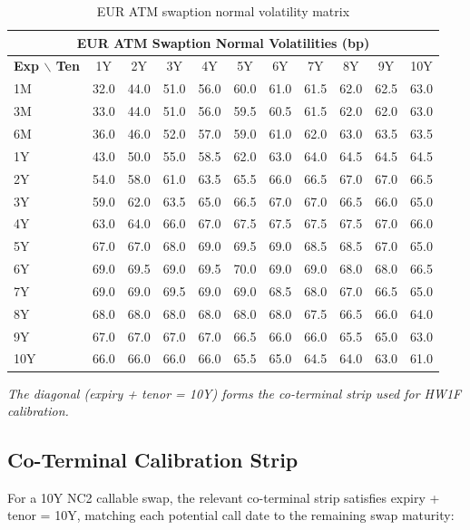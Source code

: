 \documentclass[conference]{IEEEtran}
\begin{document}
\begin{table}[!t]
\centering
\begin{tabular}{l|cccccccccc}
\toprule
\multicolumn{11}{c}{\textbf{EUR ATM Swaption Normal Volatilities (bp)}} \\
\midrule
\textbf{Exp $\backslash$ Ten} & 1Y & 2Y & 3Y & 4Y & 5Y & 6Y & 7Y & 8Y & 9Y & 10Y \\
\midrule
1M & 32.0 & 44.0 & 51.0 & 56.0 & 60.0 & 61.0 & 61.5 & 62.0 & 62.5 & 63.0 \\
3M & 33.0 & 44.0 & 51.0 & 56.0 & 59.5 & 60.5 & 61.5 & 62.0 & 62.0 & 63.0 \\
6M & 36.0 & 46.0 & 52.0 & 57.0 & 59.0 & 61.0 & 62.0 & 63.0 & 63.5 & 63.5 \\
1Y & 43.0 & 50.0 & 55.0 & 58.5 & 62.0 & 63.0 & 64.0 & 64.5 & 64.5 & 64.5 \\
2Y & 54.0 & 58.0 & 61.0 & 63.5 & 65.5 & 66.0 & 66.5 & 67.0 & 67.0 & 66.5 \\
3Y & 59.0 & 62.0 & 63.5 & 65.0 & 66.5 & 67.0 & 67.0 & 66.5 & 66.0 & 65.0 \\
4Y & 63.0 & 64.0 & 66.0 & 67.0 & 67.5 & 67.5 & 67.5 & 67.5 & 67.0 & 66.0 \\
5Y & 67.0 & 67.0 & 68.0 & 69.0 & 69.5 & 69.0 & 68.5 & 68.5 & 67.0 & 65.0 \\
6Y & 69.0 & 69.5 & 69.0 & 69.5 & 70.0 & 69.0 & 69.0 & 68.0 & 68.0 & 66.5 \\
7Y & 69.0 & 69.0 & 69.5 & 69.0 & 69.0 & 68.5 & 68.0 & 67.0 & 66.5 & 65.0 \\
8Y & 68.0 & 68.0 & 68.0 & 68.0 & 68.0 & 68.0 & 67.5 & 66.5 & 66.0 & 64.0 \\
9Y & 67.0 & 67.0 & 67.0 & 67.0 & 66.5 & 66.0 & 66.0 & 65.5 & 65.0 & 63.0 \\
10Y & 66.0 & 66.0 & 66.0 & 66.0 & 65.5 & 65.0 & 64.5 & 64.0 & 63.0 & 61.0 \\
\bottomrule
\end{tabular}
\caption{EUR ATM swaption normal volatility matrix}
\end{table}

\noindent\textit{The diagonal (expiry + tenor = 10Y) forms the co-terminal strip used for HW1F calibration.}

\subsection{Co-Terminal Calibration Strip}

For a 10Y NC2 callable swap, the relevant co-terminal strip satisfies expiry + tenor = 10Y, matching each potential call date to the remaining swap maturity:
\end{document}
